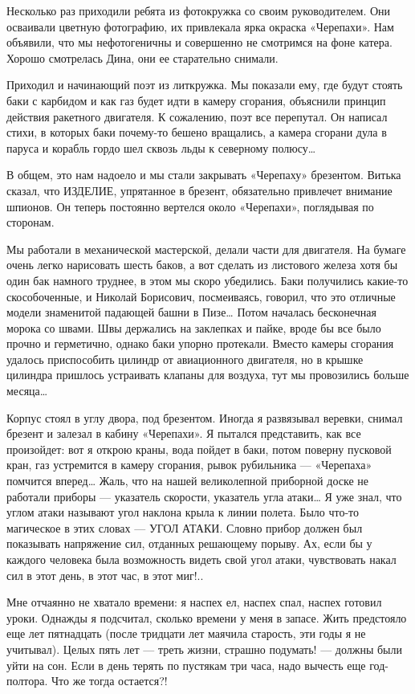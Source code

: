 Несколько раз приходили ребята из  фотокружка со своим руководителем.  Они
осваивали цветную фотографию, их  привлекала ярка окраска «Черепахи».  Нам
объявили, что мы нефотогеничны и  совершенно не смотримся на фоне  катера.
Хорошо смотрелась Дина, они ее старательно снимали.

Приходил и начинающий поэт из литкружка. Мы показали ему, где будут стоять
баки с карбидом и как газ будет идти в камеру сгорания, объяснили  принцип
действия ракетного двигателя. К сожалению, поэт все перепутал. Он  написал
стихи, в которых баки почему-то бешено вращались, а камера сгорани дула  в
паруса и корабль гордо шел сквозь льды к северному полюсу…

В общем, это нам надоело и мы стали закрывать «Черепаху» брезентом. Витька
сказал, что ИЗДЕЛИЕ, упрятанное в брезент, обязательно привлечет  внимание
шпионов. Он  теперь постоянно  вертелся  около «Черепахи»,  поглядывая  по
сторонам.

Мы работали  в механической  мастерской, делали  части для  двигателя.  На
бумаге очень  легко нарисовать  шесть баков,  а вот  сделать из  листового
железа хотя бы один бак намного  труднее, в этом мы скоро убедились.  Баки
получились  какие-то  скособоченные,  и  Николай  Борисович,  посмеиваясь,
говорил, что это отличные модели  знаменитой падающей башни в Пизе…  Потом
началась бесконечная морока со швами. Швы держались на заклепках и  пайке,
вроде бы  все было  прочно  и герметично,  однако баки  упорно  протекали.
Вместо  камеры  сгорания  удалось  приспособить  цилиндр  от  авиационного
двигателя, но в крышке цилиндра  пришлось устраивать клапаны для  воздуха,
тут мы провозились больше месяца…

Корпус стоял в  углу двора,  под брезентом. Иногда  я развязывал  веревки,
снимал брезент и залезал в  кабину «Черепахи». Я пытался представить,  как
все произойдет: вот  я открою  краны, вода  пойдет в  баки, потом  поверну
пусковой кран,  газ  устремится  в камеру  сгорания,  рывок  рубильника  —
«Черепаха» помчится  вперед… Жаль,  что  на нашей  великолепной  приборной
доске не работали приборы  — указатель скорости,  указатель угла атаки…  Я
уже знал, что углом атаки называют угол наклона крыла к линии полета. Было
что-то магическое в  этих словах —  УГОЛ АТАКИ. Словно  прибор должен  был
показывать напряжение  сил,  отданных  решающему порыву.  Ах,  если  бы  у
каждого человека  была возможность  видеть  свой угол  атаки,  чувствовать
накал сил в этот день, в этот час, в этот миг!..

Мне отчаянно не хватало времени: я наспех ел, наспех спал, наспех  готовил
уроки. Однажды  я  подсчитал,  сколько  времени  у  меня  в  запасе.  Жить
предстояло еще лет  пятнадцать (после тридцати  лет маячила старость,  эти
годы я не  учитывал). Целых пять  лет — треть  жизни, страшно подумать!  —
должны были уйти на  сон. Если в  день терять по  пустякам три часа,  надо
вычесть еще год-полтора. Что же тогда остается?!

